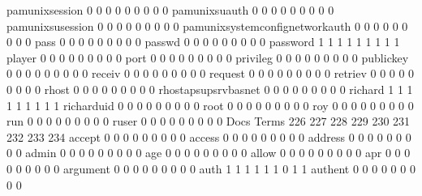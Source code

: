 \documentclass[compress,8pt]{beamer}
\begin{document}
\begin{frame}
\begin{Schunk}
  pamunixsession                             0   0   0   0   0   0   0   0   0
  pamunixsuauth                              0   0   0   0   0   0   0   0   0
  pamunixsusession                           0   0   0   0   0   0   0   0   0
  pamunixsystemconfignetworkauth             0   0   0   0   0   0   0   0   0
  pass                                       0   0   0   0   0   0   0   0   0
  passwd                                     0   0   0   0   0   0   0   0   0
  password                                   1   1   1   1   1   1   1   1   1
  player                                     0   0   0   0   0   0   0   0   0
  port                                       0   0   0   0   0   0   0   0   0
  privileg                                   0   0   0   0   0   0   0   0   0
  publickey                                  0   0   0   0   0   0   0   0   0
  receiv                                     0   0   0   0   0   0   0   0   0
  request                                    0   0   0   0   0   0   0   0   0
  retriev                                    0   0   0   0   0   0   0   0   0
  rhost                                      0   0   0   0   0   0   0   0   0
  rhostapsupsrvbasnet                        0   0   0   0   0   0   0   0   0
  richard                                    1   1   1   1   1   1   1   1   1
  richarduid                                 0   0   0   0   0   0   0   0   0
  root                                       0   0   0   0   0   0   0   0   0
  roy                                        0   0   0   0   0   0   0   0   0
  run                                        0   0   0   0   0   0   0   0   0
  ruser                                      0   0   0   0   0   0   0   0   0
                                          Docs
Terms                                      226 227 228 229 230 231 232 233 234
  accept                                     0   0   0   0   0   0   0   0   0
  access                                     0   0   0   0   0   0   0   0   0
  address                                    0   0   0   0   0   0   0   0   0
  admin                                      0   0   0   0   0   0   0   0   0
  age                                        0   0   0   0   0   0   0   0   0
  allow                                      0   0   0   0   0   0   0   0   0
  apr                                        0   0   0   0   0   0   0   0   0
  argument                                   0   0   0   0   0   0   0   0   0
  auth                                       1   1   1   1   1   1   0   1   1
  authent                                    0   0   0   0   0   0   0   0   0

\end{Schunk}
\end{frame}
\end{document}

